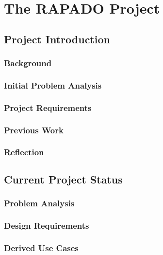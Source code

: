 \chapter{The RAPADO Project}
\section{Project Introduction}
\subsection{Background}
\subsection{Initial Problem Analysis}
\subsection{Project Requirements}
\subsection{Previous Work}
\subsection{Reflection}
\section{Current Project Status}
\subsection{Problem Analysis}
\subsection{Design Requirements}
\subsection{Derived Use Cases}

\begin{comment}

\cite{kliewer2005optimierung}

\begin{table}[bp]
	\centering
		\caption{Beispiel 1 zum Einfügen einer Tabelle}
		\begin{tabular}{| c c c |}
		\hline
			&&\\
			Monat & Linie & Minuten\\
			\hline
			\hline
			&&\\
			Jan & U7 & 10 \\
			Feb & U9 & 12 \\
			Mär & U9 & 20 \\
			\hline
		\end{tabular}

	\label{tab:Beispiel1}
\end{table}


\begin{figure}[tp]
	\centering
		\texttt{[image: ./Bilder/bsp2.png]}
	\caption{Beispiel 2 zum Einfügen einer Grafik}
	\label{fig:bsp2}
\end{figure}
\end{comment}
